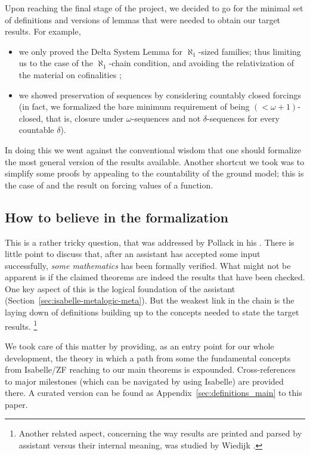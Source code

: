 Upon reaching the final stage of the project, we decided to go for the minimal
set of definitions and versions of lemmas that were needed to obtain
our target results. For example,
\begin{itemize}
\item
  we only proved the Delta System Lemma for $\aleph_1$-sized families;
  thus limiting us to the case of the $\aleph_1$-chain condition, and avoiding the relativization
  of the material on cofinalities \cite{Delta_System_Lemma-AFP};
\item we showed preservation of sequences by considering countably
  closed forcings (in fact, we formalized the bare minimum requirement
  of being $({<}\omega{+}1)$-closed, that is, closure under
  $\omega$-sequences and not $\delta$-sequences for every countable $\delta$).
\end{itemize}
In doing this we went against the conventional wisdom that one should formalize the most general version of the
results available. Another shortcut we took was to
simplify some proofs by appealing to the countability of the ground
model; this is the case of
 and the result on forcing
values of a function.

\subsection{How to believe in the formalization}
\label{sec:how-believe-formalization}

This is a rather tricky question, that was addressed by Pollack in his
\cite{MR1686867}. There is little point to discuss that, after an
assistant has accepted some input successfully, \emph{some
mathematics} has been formally verified. What might not be apparent is
if the claimed theorems are indeed the results that have been
checked. One key aspect of this is the logical foundation of the
assistant (Section~\ref{sec:isabelle-metalogic-meta}). But the weakest
link in the chain is the laying down of definitions building up to the
concepts needed to state the target results.%
\footnote{%
Another related aspect,
concerning the way results are printed and parsed by assistant versus
their internal meaning, was studied by Wiedijk \cite{zbMATH06319597}.}

We took care of this matter by providing, as an entry point for our
whole development, the theory  in which a
path from some the fundamental concepts from Isabelle/ZF reaching to our main theorems
is expounded. Cross-references to major milestones (which can be
navigated by using Isabelle) are provided there. A curated version can
be found as Appendix~\ref{sec:definitions_main} to this paper.

